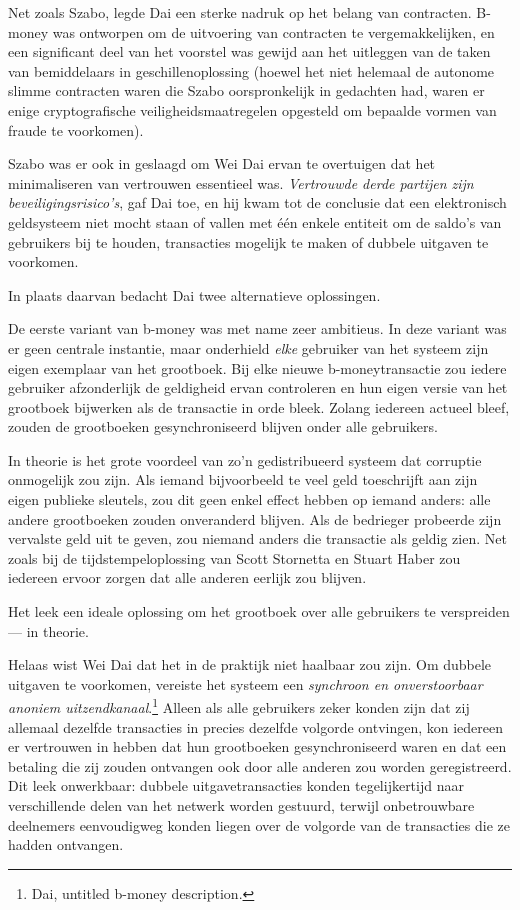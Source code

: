 \documentclass[
  a5paper,
  smalldemyvopaper,11pt,twoside,onecolumn,openright,extrafontsizes,
hidelinks]{memoir}
\begin{document}
Net zoals Szabo, legde Dai een sterke nadruk op het belang van
contracten. B-money was ontworpen om de uitvoering van contracten te
vergemakkelijken, en een significant deel van het voorstel was gewijd
aan het uitleggen van de taken van bemiddelaars in geschillenoplossing
(hoewel het niet helemaal de autonome slimme contracten waren die Szabo
oorspronkelijk in gedachten had, waren er enige cryptografische
veiligheidsmaatregelen opgesteld om bepaalde vormen van fraude te
voorkomen).

Szabo was er ook in geslaagd om Wei Dai ervan te overtuigen dat het
minimaliseren van vertrouwen essentieel was. \emph{Vertrouwde derde
partijen zijn beveiligingsrisico's}, gaf Dai toe, en hij kwam tot de
conclusie dat een elektronisch geldsysteem niet mocht staan of vallen
met één enkele entiteit om de saldo's van gebruikers bij te houden,
transacties mogelijk te maken of dubbele uitgaven te voorkomen.

In plaats daarvan bedacht Dai twee alternatieve oplossingen.

De eerste variant van b-money was met name zeer ambitieus. In deze
variant was er geen centrale instantie, maar onderhield \emph{elke}
gebruiker van het systeem zijn eigen exemplaar van het grootboek. Bij
elke nieuwe b-moneytransactie zou iedere gebruiker afzonderlijk de
geldigheid ervan controleren en hun eigen versie van het grootboek
bijwerken als de transactie in orde bleek. Zolang iedereen actueel
bleef, zouden de grootboeken gesynchroniseerd blijven onder alle
gebruikers.

In theorie is het grote voordeel van zo'n gedistribueerd systeem dat
corruptie onmogelijk zou zijn. Als iemand bijvoorbeeld te veel geld
toeschrijft aan zijn eigen publieke sleutels, zou dit geen enkel effect
hebben op iemand anders: alle andere grootboeken zouden onveranderd
blijven. Als de bedrieger probeerde zijn vervalste geld uit te geven,
zou niemand anders die transactie als geldig zien. Net zoals bij de
tijdstempeloplossing van Scott Stornetta en Stuart Haber zou iedereen
ervoor zorgen dat alle anderen eerlijk zou blijven.

Het leek een ideale oplossing om het grootboek over alle gebruikers te
verspreiden --- in theorie.

Helaas wist Wei Dai dat het in de praktijk niet haalbaar zou zijn. Om
dubbele uitgaven te voorkomen, vereiste het systeem een \emph{synchroon
en onverstoorbaar anoniem uitzendkanaal}.\footnote{Dai, untitled b-money
  description.} Alleen als alle gebruikers zeker konden zijn dat zij
allemaal dezelfde transacties in precies dezelfde volgorde ontvingen,
kon iedereen er vertrouwen in hebben dat hun grootboeken
gesynchroniseerd waren en dat een betaling die zij zouden ontvangen ook
door alle anderen zou worden geregistreerd. Dit leek onwerkbaar: dubbele
uitgavetransacties konden tegelijkertijd naar verschillende delen van
het netwerk worden gestuurd, terwijl onbetrouwbare deelnemers
eenvoudigweg konden liegen over de volgorde van de transacties die ze
hadden ontvangen.
\end{document}
